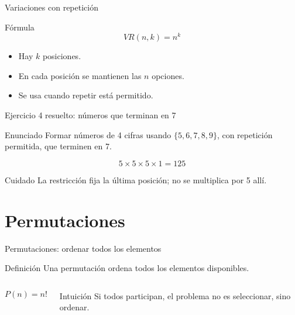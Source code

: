 \documentclass[aspectratio=169,11pt]{beamer}
\begin{document}
\begin{frame}{Variaciones con repetición}
\begin{block}{Fórmula}
\[
VR(n,k)=n^k
\]
\end{block}
\begin{itemize}
  \item Hay $k$ posiciones.
  \item En cada posición se mantienen las $n$ opciones.
  \item Se usa cuando repetir está permitido.
\end{itemize}
\end{frame}

\begin{frame}{Ejercicio 4 resuelto: números que terminan en 7}
\begin{block}{Enunciado}
Formar números de 4 cifras usando $\{5,6,7,8,9\}$, con repetición permitida, que terminen en 7.
\end{block}
\pause
\begin{center}
\end{center}
\[
5\times5\times5\times1=125
\]
\begin{alertblock}{Cuidado}
La restricción fija la última posición; no se multiplica por 5 allí.
\end{alertblock}
\end{frame}

\section{Permutaciones}

\begin{frame}{Permutaciones: ordenar todos los elementos}
\begin{block}{Definición}
Una permutación ordena todos los elementos disponibles.
\end{block}
\begin{columns}[T]
\[
P(n)=n!
\]
\begin{exampleblock}{Intuición}
Si todos participan, el problema no es seleccionar, sino ordenar.
\end{exampleblock}
\end{columns}
\end{frame}
\end{document}
